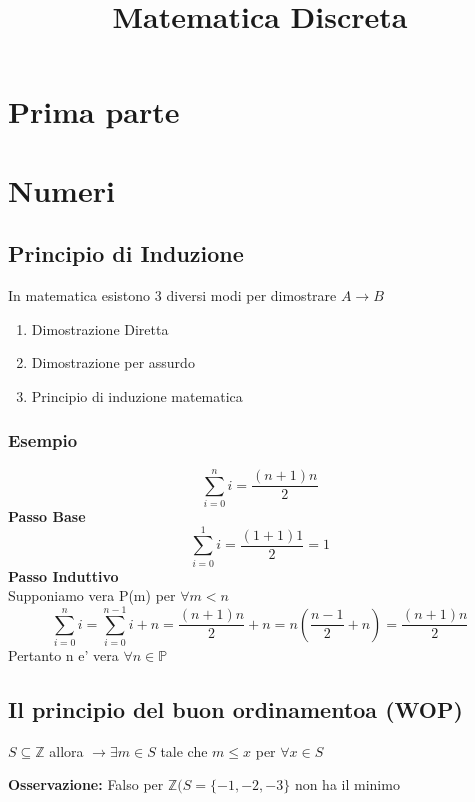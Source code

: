 \documentclass{article}
\title{Matematica Discreta}
\begin{document}
    \section{Prima parte}
    \begin{flushleft}

    \end{flushleft}
    \section{Numeri}
    \subsection{Principio di Induzione}
    \begin{flushleft}
        In matematica esistono 3 diversi modi per dimostrare
        $A\to B$
        \begin{enumerate}
            \item Dimostrazione Diretta
            \item Dimostrazione per assurdo
            \item Principio di induzione matematica
        \end{enumerate}
        \subsubsection{Esempio}
        \begin{equation}
            \sum_{i=0}^n i = \frac{(n+1)n}{2}
            \label{eq:1 }
        \end{equation}
        \textbf{Passo Base}\\
        \begin{equation}
            \sum_{i=0}^1 i = \frac{(1+1)1}{2} = 1
            \label{eq:2 }
        \end{equation}
        \textbf{Passo Induttivo}\\
        Supponiamo vera P(m) per $\forall m<n$
        \begin{equation}
            \sum_{i=0}^n i = \sum_{i=0}^{n-1} i+n= \frac{(n+1)n}{2} +n = n(\frac{n-1}{2} +n)=\frac{(n+1)n}{2}
            \label{eq: 3}
        \end{equation}
        Pertanto n e' vera $\forall n \in \mathbb{P}$
    \end{flushleft}
    \subsection{Il principio del buon ordinamentoa (WOP)}
    \begin{flushleft}
            $S \subseteq \mathbb{Z}$ allora $\rightarrow \exists m\in S$ tale che $m\leq x$ per $\forall x\in S$
    \end{flushleft}
    \begin{flushleft}
        \textbf{Osservazione:} Falso per $\mathbb{Z} (S = \{-1,-2,-3\}$ non ha il minimo
    \end{flushleft}
\end{document}
